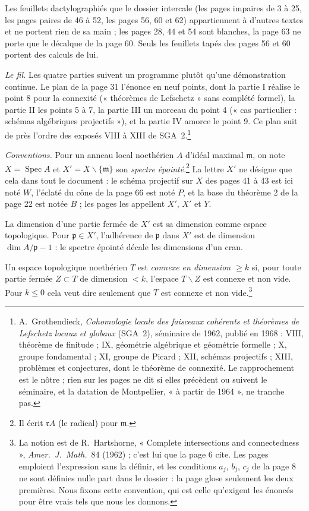 \documentclass[11pt,a4paper]{article}
\begin{document}
Les feuillets dactylographiés que le dossier intercale (les pages impaires de
3 à 25, les pages paires de 46 à 52, les pages 56, 60 et 62) appartiennent à d'autres textes et ne
portent rien de sa main ; les pages 28, 44 et 54 sont blanches, la page 63 ne
porte que le décalque de la page 60. Seuls les feuillets tapés des pages 56
et 60 portent des calculs de lui.

\emph{Le fil.} Les quatre parties suivent un programme plutôt qu'une
démonstration continue. Le plan de la page 31 l'énonce en neuf points, dont la
partie I réalise le point 8 pour la connexité (« théorèmes de Lefschetz »
sans complété formel), la partie II les points 5 à 7, la partie III un
morceau du point 4 (« cas particulier : schémas algébriques projectifs »), et la partie IV
amorce le point 9. Ce plan suit de près l'ordre des exposés VIII à XIII de
SGA~2.\footnote{A.~Grothendieck, \emph{Cohomologie locale des faisceaux
cohérents et théorèmes de Lefschetz locaux et globaux} (SGA~2), séminaire de
1962, publié en 1968 : VIII, théorème de finitude ; IX, géométrie algébrique
et géométrie formelle ; X, groupe fondamental ; XI, groupe de Picard ; XII,
schémas projectifs ; XIII, problèmes et conjectures, dont le théorème de
connexité. Le rapprochement est le nôtre ; rien sur les pages ne dit si elles
précèdent ou suivent le séminaire, et la datation de Montpellier, « à partir
de 1964 », ne tranche pas.}

\emph{Conventions.} Pour un anneau local noethérien $A$ d'idéal maximal
$\mathfrak{m}$, on note $X = \operatorname{Spec} A$ et
$X' = X \smallsetminus \lbrace \mathfrak{m} \rbrace$ son \emph{spectre
épointé}.\footnote{Il écrit $\mathfrak{r}A$ (le radical) pour $\mathfrak{m}$.}
La lettre $X'$ ne désigne que cela dans tout le document : le schéma
projectif sur $X$ des pages 41 à 43 est ici noté $W$, l'éclaté du cône de la
page 66 est noté $P$, et la base du théorème 2 de la page 22 est notée $B$ ;
les pages les appellent $X'$, $X'$ et $Y$.

La dimension d'une partie fermée de $X'$ est sa dimension comme espace
topologique. Pour $\mathfrak{p} \in X'$, l'adhérence de $\mathfrak{p}$ dans
$X'$ est de dimension $\dim A/\mathfrak{p} - 1$ : le spectre épointé décale
les dimensions d'un cran.

Un espace topologique noethérien $T$ est \emph{connexe en dimension $\geq k$}
si, pour toute partie fermée $Z \subset T$ de dimension $< k$, l'espace
$T \smallsetminus Z$ est connexe et non vide. Pour $k \leq 0$ cela veut dire
seulement que $T$ est connexe et non vide.\footnote{La notion est de
R.~Hartshorne, « Complete intersections and connectedness », \emph{Amer.\ J.\
Math.}\ 84 (1962) ; c'est lui que la page 6 cite. Les pages
emploient l'expression sans la définir, et les conditions $a_j$, $b_j$, $c_j$
de la page 8 ne sont définies nulle part dans le dossier : la page glose
seulement les deux premières. Nous fixons cette
convention, qui est celle qu'exigent les énoncés pour être vrais tels que nous
les donnons.}
\end{document}
